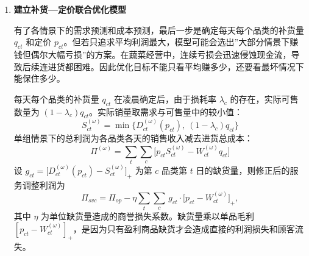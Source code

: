 \documentclass[withoutpreface,bwprint]{cumcmthesis} %
\numberwithin{equation}{section}
\begin{document}
\begin{enumerate}
\hspace*{2em}第一问已证实六品类销量之间存在正相关——市场整体向好时各品类一起好、市场低迷时一起差。若每个品类独立生成需求情景，会人为削弱这种联动效应，导致在糟糕日子里低估多个品类同时滞销的风险。为保留品类间的真实相关性，模型将六个品类的需求预测残差与六个品类的成本预测残差按日期拼接成一个 12 维向量，截断极端值后进行中心化处理：
\begin{equation}
    \mathbf{r}_t = \big(e_{1t}^{D},\ldots,e_{6t}^{D},\ e_{1t}^{W},\ldots,e_{6t}^{W}\big)^{\top}
\end{equation}
\hspace*{2em}然后从历史数据中所有连续的 7 天时间段里随机抽取 600 个（允许重复），每个 7 天时间段产生一组未来一周的联合残差。将抽取的残差加回到对应的需求预测基线 $\hat{D}_{ct}$ 上，得到第 $\omega$ 组情景下的实际需求：
\begin{equation}
    D_{ct}^{(\omega)} = \hat{D}_{ct} \cdot \exp\big(e_{ct}^{(\omega)}\big).
\end{equation}
\hspace*{2em}这样生成的情景同时保留了三个层面的相关性：品类之间的联动效应、成本与需求之间的相关性、以及一周内连续几天之间的时间连续性。




\item \textbf{建立补货—定价联合优化模型}

\hspace*{2em}有了各情景下的需求预测和成本预测，最后一步是确定每天每个品类的补货量 $q_{ct}$ 和定价 $p_{ct}$。但若只追求平均利润最大，模型可能会选出''大部分情景下赚钱但偶尔大幅亏损''的方案。在蔬菜经营中，连续亏损会迅速侵蚀现金流，导致后续连进货都困难。因此优化目标不能只看平均赚多少，还要看最坏情况下能保住多少。

\hspace*{2em}每天每个品类的补货量 $q_{ct}$ 在凌晨确定后，由于损耗率 $\lambda_c$ 的存在，实际可售数量为 $(1-\lambda_c)q_{ct}$。实际销量取需求与可售量中的较小值：
\begin{equation}
    S_{ct}^{(\omega)} = \min\big\{D_{ct}^{(\omega)}(p_{ct}),\ (1-\lambda_c)q_{ct}\big\}
\end{equation}
\hspace*{2em}单组情景下的总利润为各品类各天的销售收入减去进货总成本：
\begin{equation}
    \Pi^{(\omega)} = \sum_t\sum_c\Big[p_{ct} S_{ct}^{(\omega)} - W_{ct}^{(\omega)} q_{ct}\Big]
\end{equation}
\hspace*{2em}设 $g_{ct} = \big[D_{ct}^{(\omega)}(p_{ct}) - S_{ct}^{(\omega)}\big]_+$ 为第 $c$ 品类第 $t$ 日的缺货量，则修正后的服务调整利润为
\begin{equation}
    \Pi_{svc} = \Pi_{op} - \eta \sum_t \sum_c\, g_{ct} \cdot \big[p_{ct} - W_{ct}^{(\omega)}\big]_+,
\end{equation}
\hspace*{2em}其中 $\eta$ 为单位缺货量造成的商誉损失系数。缺货量乘以单品毛利 $[p_{ct} - W_{ct}^{(\omega)}]_+$，是因为只有盈利商品缺货才会造成直接的利润损失和顾客流失。


\end{enumerate}
\end{document}
